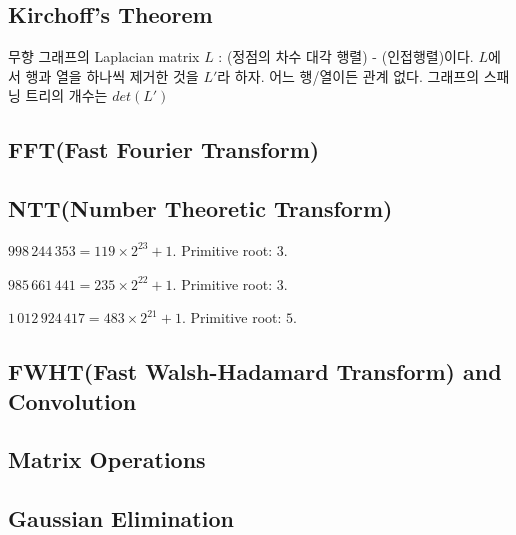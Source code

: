 \documentclass[9pt,landscape,a4paper,twocolumn]{extarticle}
\begin{document}


\subsection{Kirchoff's Theorem}

무향 그래프의 Laplacian matrix $L$ : (정점의 차수 대각 행렬) - (인접행렬)이다.
$L$에서 행과 열을 하나씩 제거한 것을 $L'$라 하자. 어느 행/열이든 관계 없다.
그래프의 스패닝 트리의 개수는 $det(L')$

% 

\subsection{FFT(Fast Fourier Transform)}


\subsection{NTT(Number Theoretic Transform)}


$998\,244\,353 = 119 \times 2^{23} + 1$. Primitive root: $3$.

$985\,661\,441 = 235 \times 2^{22} + 1$. Primitive root: $3$.

$1\,012\,924\,417 = 483 \times 2^{21} + 1$. Primitive root: $5$.

\subsection{FWHT(Fast Walsh-Hadamard Transform) and Convolution}


\subsection{Matrix Operations}


\subsection{Gaussian Elimination}

\end{document}
